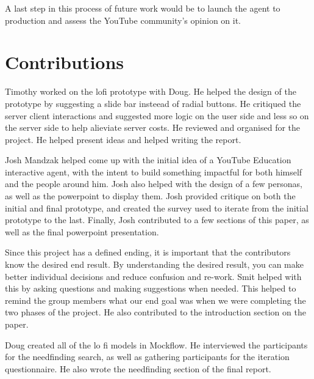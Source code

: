 \documentclass[letterpaper]{article} %
\begin{document}
A last step in this process of future work would be to launch the agent to production and assess the YouTube community’s opinion on it.


\section{Contributions}

Timothy worked on the lofi prototype with Doug. He helped the design of the prototype by suggesting a slide bar insteead of radial buttons. He critiqued the server client interactions and suggested more logic on the user side and less so on the server side to help alieviate server costs. He reviewed and organised for the project. He helped present ideas and helped writing the report. 

Josh Mandzak helped come up with the initial idea of a YouTube Education interactive agent, with the intent to build something impactful for both himself and the people around him. Josh also helped with the design of a few personas, as well as the powerpoint to display them. Josh provided critique on both the initial and final prototype, and created the survey used to iterate from the initial prototype to the last. Finally, Josh contributed to a few sections of this paper, as well as the final powerpoint presentation.

Since this project has a defined ending, it is important that the contributors know the desired end result. By understanding the desired result, you can make better individual decisions and reduce confusion and re-work. Smit helped with this by asking questions and making suggestions when needed. This helped to remind the group members what our end goal was when we were completing the two phases of the project. He also contributed to the introduction section on the paper.

Doug created all of the lo fi models in Mockflow. He interviewed the participants for the needfinding search, as well as gathering participants for the iteration questionnaire. He also wrote the needfinding section of the final report.
\end{document}
